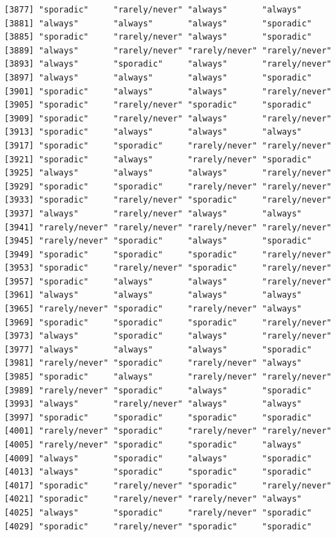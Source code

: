 \documentclass[
  letterpaper,
  DIV=11,
  numbers=noendperiod]{scrartcl}
\begin{document}
\begin{verbatim}
[3877] "sporadic"     "rarely/never" "always"       "always"      
[3881] "always"       "always"       "always"       "sporadic"    
[3885] "sporadic"     "rarely/never" "always"       "sporadic"    
[3889] "always"       "rarely/never" "rarely/never" "rarely/never"
[3893] "always"       "sporadic"     "always"       "rarely/never"
[3897] "always"       "always"       "always"       "sporadic"    
[3901] "sporadic"     "always"       "always"       "rarely/never"
[3905] "sporadic"     "rarely/never" "sporadic"     "sporadic"    
[3909] "sporadic"     "rarely/never" "always"       "rarely/never"
[3913] "sporadic"     "always"       "always"       "always"      
[3917] "sporadic"     "sporadic"     "rarely/never" "rarely/never"
[3921] "sporadic"     "always"       "rarely/never" "sporadic"    
[3925] "always"       "always"       "always"       "rarely/never"
[3929] "sporadic"     "sporadic"     "rarely/never" "rarely/never"
[3933] "sporadic"     "rarely/never" "sporadic"     "rarely/never"
[3937] "always"       "rarely/never" "always"       "always"      
[3941] "rarely/never" "rarely/never" "rarely/never" "rarely/never"
[3945] "rarely/never" "sporadic"     "always"       "sporadic"    
[3949] "sporadic"     "sporadic"     "sporadic"     "rarely/never"
[3953] "sporadic"     "rarely/never" "sporadic"     "rarely/never"
[3957] "sporadic"     "always"       "always"       "rarely/never"
[3961] "always"       "always"       "always"       "always"      
[3965] "rarely/never" "sporadic"     "rarely/never" "always"      
[3969] "sporadic"     "sporadic"     "sporadic"     "rarely/never"
[3973] "always"       "sporadic"     "always"       "rarely/never"
[3977] "always"       "always"       "always"       "sporadic"    
[3981] "rarely/never" "sporadic"     "rarely/never" "always"      
[3985] "sporadic"     "always"       "rarely/never" "rarely/never"
[3989] "rarely/never" "sporadic"     "always"       "sporadic"    
[3993] "always"       "rarely/never" "always"       "always"      
[3997] "sporadic"     "sporadic"     "sporadic"     "sporadic"    
[4001] "rarely/never" "sporadic"     "rarely/never" "rarely/never"
[4005] "rarely/never" "sporadic"     "sporadic"     "always"      
[4009] "always"       "sporadic"     "always"       "sporadic"    
[4013] "always"       "sporadic"     "sporadic"     "sporadic"    
[4017] "sporadic"     "rarely/never" "sporadic"     "rarely/never"
[4021] "sporadic"     "rarely/never" "rarely/never" "always"      
[4025] "always"       "sporadic"     "rarely/never" "sporadic"    
[4029] "sporadic"     "rarely/never" "sporadic"     "sporadic"    

\end{verbatim}
\end{document}
